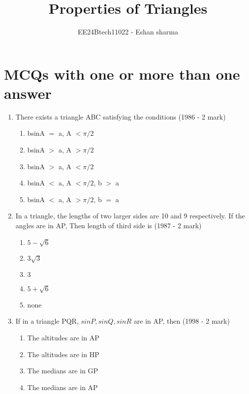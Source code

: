 \documentclass[journal,12pt,twocolumn]{IEEEtran}
\theoremstyle{remark}
\begin{document}

\vspace{3cm}

\title{Properties of Triangles}
\author{EE24Btech11022 - Eshan sharma}
\maketitle
\newpage
\bigskip

\renewcommand{\thefigure}{\theenumi}
\renewcommand{\thetable}{\theenumi}


\section{MCQs with one or more than one answer}
\begin{enumerate}[label=\arabic*.]
    \item There exists a triangle ABC satisfying the conditions
    \hfill{(1986 - 2 mark)}
    \begin{enumerate}[label=(\alph*)]
    \item bsinA $=$ a, A $<\pi/2$
    \item bsinA $>$ a, A $>\pi/2$
    \item bsinA $>$ a, A $<\pi/2$
    \item bsinA $<$ a, A $<\pi/2$, b $>$ a
    \item bsinA $<$ a, A $>\pi/2$, b $=$ a
    \end{enumerate}
    \item In a triangle, the lengths of two larger sides are 10 and 9 respectively. If the angles are in AP, Then length of third side is
    \hfill{(1987 - 2 mark)}
    \begin{enumerate}[label=(\alph*)]
    \item $5-\sqrt{6}$ 
    \item $3\sqrt{3}$
    \item $3$
    \item $5+\sqrt{6}$ 
    \item none
    \end{enumerate}
    \item If in a triangle PQR, $sinP, sinQ, sinR$ are in AP, then
    \hfill{(1998 - 2 mark)}
    \begin{enumerate}[label=(\alph*)]
    \item The altitudes are in AP
    \item The altitudes are in HP
    \item The medians are in GP
    \item The medians are in AP

\end{enumerate}
\end{enumerate}
\end{document}
